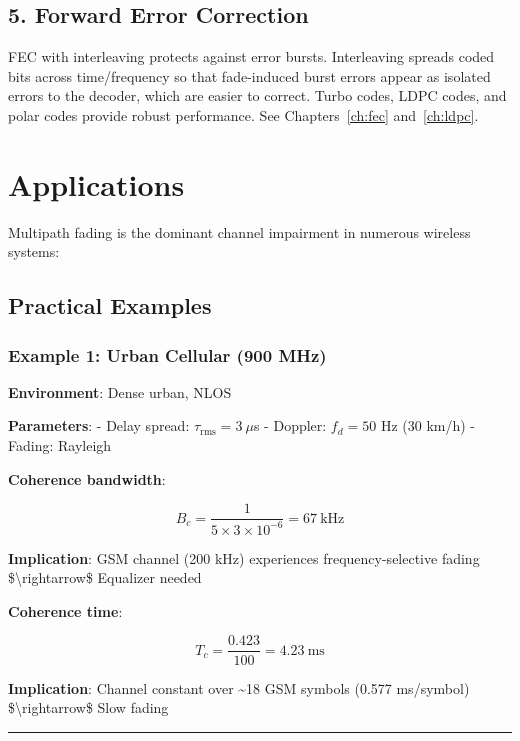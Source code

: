\subsection{5. Forward Error Correction}

FEC with interleaving protects against error bursts. Interleaving spreads coded bits across time/frequency so that fade-induced burst errors appear as isolated errors to the decoder, which are easier to correct. Turbo codes, LDPC codes, and polar codes provide robust performance. See Chapters~\ref{ch:fec} and~\ref{ch:ldpc}.

\section{Applications}

Multipath fading is the dominant channel impairment in numerous wireless systems:

\subsection{Practical Examples}\label{practical-examples}

\subsubsection{Example 1: Urban Cellular (900
MHz)}\label{example-1-urban-cellular-900-mhz}

\textbf{Environment}: Dense urban, NLOS

\textbf{Parameters}: - Delay spread: \(\tau_{\text{rms}} = 3\ \mu\)s -
Doppler: \(f_d = 50\) Hz (30 km/h) - Fading: Rayleigh

\textbf{Coherence bandwidth}:

\[
B_c = \frac{1}{5 \times 3 \times 10^{-6}} = 67\ \text{kHz}
\]

\textbf{Implication}: GSM channel (200 kHz) experiences
frequency-selective fading \$\textbackslash rightarrow\$ Equalizer
needed

\textbf{Coherence time}:

\[
T_c = \frac{0.423}{100} = 4.23\ \text{ms}
\]

\textbf{Implication}: Channel constant over \textasciitilde18 GSM
symbols (0.577 ms/symbol) \$\textbackslash rightarrow\$ Slow fading

\begin{center}\rule{0.5\linewidth}{0.5pt}\end{center}

